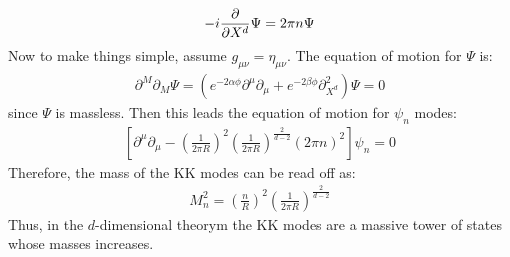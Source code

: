 \begin{align}
    -i\pdv{X^{d}} \Psi = 2\pi n \Psi
\end{align}
Now to make things simple, assume $g_{\mu\nu} = \eta _{\mu\nu}$. The equation of motion for $\Psi$ is:
\begin{align}
    \partial ^{M} \partial _{M} \Psi = (e^{-2\alpha \phi} \partial ^{\mu} \partial _{\mu} + e^{-2\beta \phi} \partial _{X^{d}}^{2}) \Psi = 0
\end{align}
since $\Psi$ is massless. Then this leads the equation of motion for $\psi _n$ modes:
\begin{align}
    \left[\partial ^{\mu}\partial _{\mu}- (\frac{1}{2\pi R})^{2} (\frac{1}{2 \pi R})^{\frac{2}{d-2}} (2\pi n)^{2}  \right] \psi _{n} = 0
\end{align}
Therefore, the mass of the KK modes can be read off as:
\begin{align}
    M_{n} ^{2}= (\frac{n}{R})^{2} (\frac{1}{2 \pi R})^{\frac{2}{d-2}}
\end{align}
Thus, in the $d$-dimensional theorym the KK modes are a massive tower of states whose masses increases.

